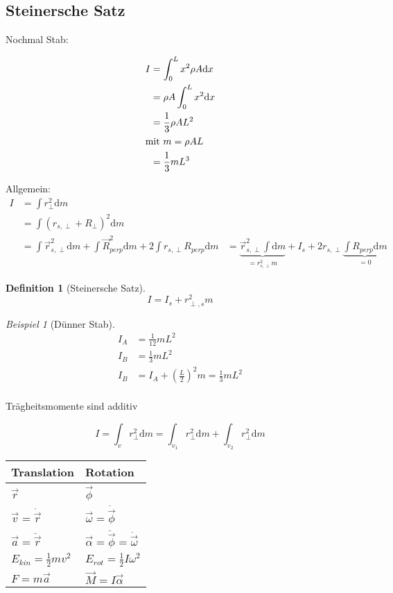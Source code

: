 \documentclass[a4paper]{scrartcl}
\renewcommand{\d}{\mathrm{d}}
\renewcommand{\v}[1]{\vec{#1}}
\theoremstyle{definition}
\newtheorem{defn}{Definition}
\theoremstyle{plain}
\theoremstyle{plain}
\theoremstyle{remark}
\theoremstyle{remark}
\theoremstyle{remark}
\newtheorem{ex}{Beispiel}
\begin{document}
\subsection{Steinersche Satz}
\label{sec-8-6}
Nochmal Stab:

\begin{align*}
I &= \int_0^L x^2 \rho A \d x \\
&= \rho A \int_0^L x^2 \d x \\
&= \frac{1}{3}\rho A L^2 \\
\intertext{mit $m = \rho A L$}
&= \frac{1}{3} m L^3
\end{align*}


Allgemein:
\begin{align*}
I &= \int r_\perp^2 \d m \\
&= \int (r_{s,\perp} + R_\perp)^2 \d m \\
&= \int \v r_{s,\perp}^2 \d m + \int \v R_{perp}^2 \d m + 2\int r_{s,\perp} R_{perp} \d m
&= \underbrace{\v r_{s,\perp}^2 \int  \d m}_{ = r_{s,\perp}^2 m} + I_s +  2r_{s,\perp} \underbrace{\int R_{perp} \d m}_{ = 0}
\end{align*}

\begin{defn}[Steinersche Satz]
\[I = I_s + r_{\perp,s}^2 m\]
\end{defn}
\begin{ex}[Dünner Stab]
\begin{align*}
I_A &= \frac{1}{12} m L^2 \\
I_B  &= \frac{1}{3} m L^2 \\
I_B &= I_A + (\frac{L}{2})^2 m = \frac{1}{3} m L^2 \\
\end{align*}
\end{ex}

Trägheitsmomente sind additiv

\[I = \int_v r_{\perp}^2 \d m = \int_{v_1} r_{\perp}^2 \d m + \int_{v_2} r_{\perp}^2 \d m\]

\begin{center}
\begin{tabular}{ll}
Translation & Rotation\\
\hline
$\v r$ & $\v \phi$\\
$\v v = \dot{\v r}$ & $\v \omega = \dot{\v \phi}$\\
$\v a = \ddot{\v r}$ & $\v \alpha = \ddot{\v \phi} = \dot{\v \omega}$\\
$\displaystyle E_{kin} = \frac{1}{2} m v^2$ & $\displaystyle E_{rot} = \frac{1}{2} I \omega^2$\\
$F = m\v a$ & $\v M = I \v \alpha$\\
\end{tabular}
\end{center}
\end{document}
